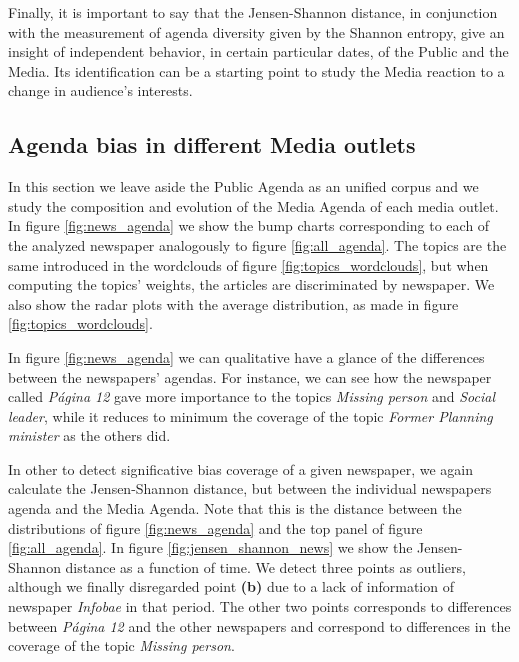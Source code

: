 \documentclass{bmcart}
\begin{document}
\par %
Finally, it is important to say that the Jensen-Shannon distance, in conjunction with the measurement of agenda diversity given by the Shannon entropy, give an insight of independent behavior, in certain particular dates,  of the Public and the Media. Its identification can be a starting point to study the Media reaction to a change in audience's interests.
 
\subsection*{Agenda bias in different Media outlets}

\par In this section we leave aside the Public Agenda as an unified corpus and we study the composition and evolution of the Media Agenda of each media outlet. 
In figure \ref{fig:news_agenda} we show the bump charts corresponding to each of the analyzed newspaper analogously to figure \ref{fig:all_agenda}.
The topics are the same introduced in the wordclouds of figure \ref{fig:topics_wordclouds}, but when computing the topics' weights,  the articles are discriminated by newspaper. 
We also show the radar plots with the average distribution, as made in figure \ref{fig:topics_wordclouds}. 

\par In figure \ref{fig:news_agenda} we can qualitative have a glance of the  differences between the newspapers' agendas.
For instance, we can see how the newspaper called \emph{P\'agina 12} gave more importance to the topics \emph{Missing person} and \emph{Social leader}, while it reduces to minimum the coverage of the topic  \emph{Former Planning minister} as the others did.

\par In other to detect significative bias coverage of a given newspaper, we again calculate the Jensen-Shannon distance, but between the individual newspapers agenda and the Media Agenda.
Note that this is the distance between the distributions of figure \ref{fig:news_agenda} and the top panel of figure \ref{fig:all_agenda}. 
 In figure \ref{fig:jensen_shannon_news} we show the Jensen-Shannon distance as a function of time.
We detect three points as outliers, although we finally disregarded point \textbf{(b)} due to a lack of  information of newspaper \emph{Infobae} in that period. 
The other two points corresponds to differences between \emph{P\'agina 12} and the other newspapers and correspond to differences in the coverage of the topic \emph{Missing person}.
\end{document}
